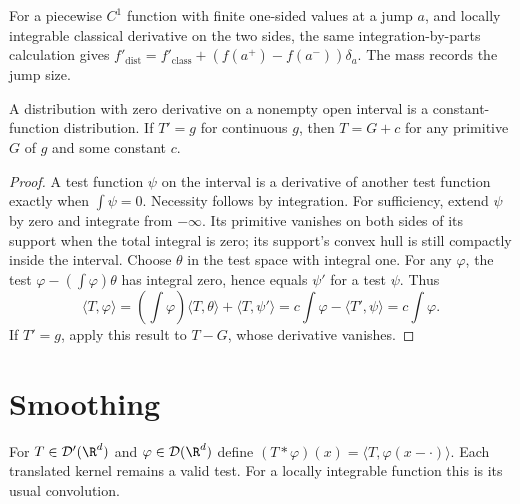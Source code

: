 For a piecewise $C^1$ function with finite one-sided values at a jump $a$, and locally integrable classical derivative on the two sides, the same integration-by-parts calculation gives $f'_{\mathrm{dist}}=f'_{\mathrm{class}}+(f(a^+)-f(a^-))\delta_a$. The mass records the jump size.

\begin{theorem}\label{thm:zeroderiv}
A distribution with zero derivative on a nonempty open interval is a constant-function distribution. If $T'=g$ for continuous $g$, then $T=G+c$ for any primitive $G$ of $g$ and some constant $c$.
\end{theorem}
\begin{proof}
A test function $\psi$ on the interval is a derivative of another test function exactly when $\int\psi=0$. Necessity follows by integration. For sufficiency, extend $\psi$ by zero and integrate from $-\infty$. Its primitive vanishes on both sides of its support when the total integral is zero; its support's convex hull is still compactly inside the interval.
Choose $\theta$ in the test space with integral one. For any $\varphi$, the test $\varphi-(\int\varphi)\theta$ has integral zero, hence equals $\psi'$ for a test $\psi$. Thus
\[
\langle T,\varphi\rangle=(\int\varphi)\langle T,\theta\rangle
+\langle T,\psi'\rangle=c\int\varphi-\langle T',\psi\rangle
=c\int\varphi.
\]
If $T'=g$, apply this result to $T-G$, whose derivative vanishes.
\end{proof}

\section{Smoothing}

For $T\in\mathcal D'(\R^d)$ and $\varphi\in\mathcal D(\R^d)$ define
$(T*\varphi)(x)=\langle T,\varphi(x-\cdot)\rangle$.
Each translated kernel remains a valid test. For a locally integrable function this is its usual convolution.

